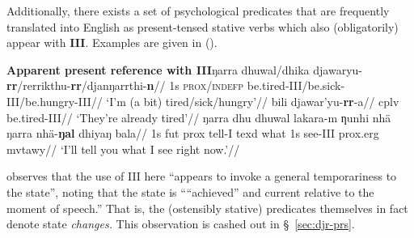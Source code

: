 Additionally, there exists a set of psychological predicates that are frequently translated into English as present-tensed stative verbs which also (obligatorily) appear with \textbf{III}. Examples are given in (\nextx).


\pex{}\textbf{Apparent present reference with \gls{III}}\a\begingl\gla ŋarra dhuwal/dhika djawaryu-\textbf{rr}/rerrikthu-\textbf{rr}/djanŋarrthi-\textbf{n}//
\glb 1s \textsc{prox/indefp} be.tired-\gls{III}/be.sick-\gls{III}/be.hungry-\gls{III}//
\glft`I'm (a bit) tired/sick/hungry'//\endgl
\a\begingl\gla bili djawar'yu-\textbf{rr}-a//
\glb \gls{cplv} be.tired-\gls{III}//
\glft`They're already tired'//\endgl
\a{}\begingl\gla ŋarra dhu dhuwal lakara-m ƞunhi nhä ŋarra nhä-\textbf{ŋal} dhiyaŋ bala//
\glb 1s \gls{fut} \gls{prox} tell-\gls{I} \gls{texd} what 1s see-\gls{III} \gls{prox}.\gls{erg} \gls{mvtawy}//
\glft`I'll tell you what I see right now.'//\endgl
\xe


\noindent \citet[365--6]{Wilkinson1991} observes that the use of \gls{III} here ``appears to invoke a general temporariness to the state'', noting that the state is ````achieved'' and current relative to the moment of speech.'' That is, the (ostensibly stative) predicates themselves in fact denote state \textit{changes.} This observation is cashed out in \S~\ref{sec:djr-prs}.


